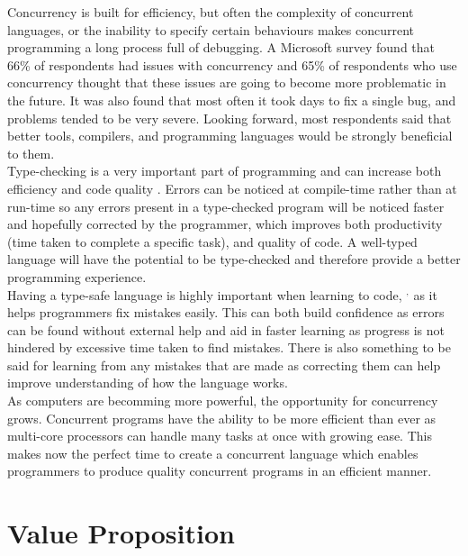 \documentclass[11pt]{article}
\begin{document}
    Concurrency is built for efficiency, but often the complexity of concurrent languages, or the 
    inability to specify certain behaviours makes concurrent programming a long process full of debugging. 
    A Microsoft survey \supercite{microsoftConcurrency} found that 66\% of respondents had issues 
    with concurrency and 65\% of respondents who use concurrency thought that these issues are going 
    to become more problematic in the future. It was also found that most often it took days to fix 
    a single bug, and problems tended to be very severe. Looking forward, most respondents said that 
    better tools, compilers, and programming languages would be strongly beneficial to them. \\

    \noindent
    Type-checking is a very important part of programming and can increase both efficiency and code 
    quality \supercite{typeChecking}. Errors can be noticed at compile-time rather than at run-time so 
    any errors present in a type-checked program will be noticed faster and hopefully corrected by the 
    programmer, which improves both productivity (time taken to complete a specific task), and quality 
    of code. A well-typed language will have the potential to be type-checked and therefore provide a 
    better programming experience. \\
    
    \noindent
    Having a type-safe language is highly important when learning to code, \supercite{typeSafe}$^,$
    \supercite{firstLanguage} as it helps programmers fix mistakes easily. This can both build confidence 
    as errors can be found without external help and aid in faster learning as progress is not hindered 
    by excessive time taken to find mistakes. There is also something to be said for learning from any 
    mistakes that are made as correcting them can help improve understanding of how the language works. \\

    \noindent
    As computers are becomming more powerful, the opportunity for concurrency grows. Concurrent programs 
    have the ability to be more efficient than ever as multi-core processors can handle many tasks at once 
    with growing ease. This makes now the perfect time to create a concurrent language which enables 
    programmers to produce quality concurrent programs in an efficient manner. \\

    \section*{Value Proposition}
\end{document}
